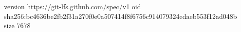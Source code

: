 version https://git-lfs.github.com/spec/v1
oid sha256:bc4636be2fb2f31a270f0e0a507414f8f6756c914079324edaeb553f12ad048b
size 7678
